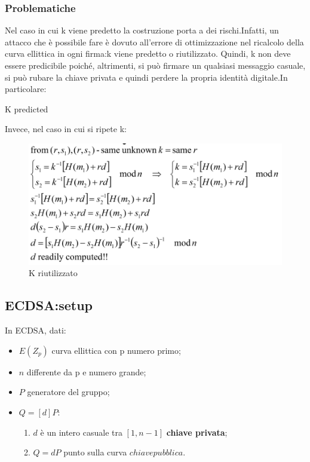 \documentclass{book}
\begin{document}
\subsubsection{Problematiche}
Nel caso in cui k viene predetto la costruzione porta a dei rischi.Infatti, un attacco che è possibile fare è dovuto all'errore di ottimizzazione nel ricalcolo della curva ellittica in ogni firma:k viene predetto o riutilizzato.
Quindi, k non deve essere predicibile poiché, altrimenti, si può firmare un qualsiasi messaggio casuale, si può rubare la chiave privata e quindi perdere la propria identità digitale\@.In particolare:
\begin{algorithm}[H]
	\caption{K predicted}
	\begin{algorithmic}
	\end{algorithmic}
\end{algorithm}
\vspace{0.2cm}
Invece, nel caso in cui si ripete k:
\begin{figure}[h]
	\centering
	\includegraphics[scale=0.5]{2022-01-14-10-15-00.png}%
	\caption{K riutilizzato}
\end{figure}
\subsection{ECDSA:setup}
In ECDSA, dati:\begin{itemize}
	\item \(E(Z_{p})\) curva ellittica con p numero primo;
	\item \(n\) differente da p e numero grande;
	\item \(P\) generatore del gruppo;
	\item \(Q=[d]P\):\begin{enumerate}
		\item \(d\) è un intero casuale tra \([1,n-1]\) \textbf{chiave privata};
		\item \(Q=dP\) punto sulla curva \(chiave pubblica\).
		\end{enumerate}
\end{itemize}\newpage
\end{document}
